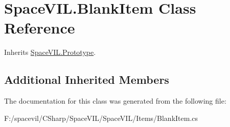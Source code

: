 \hypertarget{class_space_v_i_l_1_1_blank_item}{}\section{Space\+V\+I\+L.\+Blank\+Item Class Reference}
\label{class_space_v_i_l_1_1_blank_item}


Inherits \mbox{\hyperlink{class_space_v_i_l_1_1_prototype}{Space\+V\+I\+L.\+Prototype}}.

\subsection*{Additional Inherited Members}


The documentation for this class was generated from the following file\+:\begin{DoxyCompactItemize}
\item 
F\+:/spacevil/\+C\+Sharp/\+Space\+V\+I\+L/\+Space\+V\+I\+L/\+Items/Blank\+Item.\+cs\end{DoxyCompactItemize}
